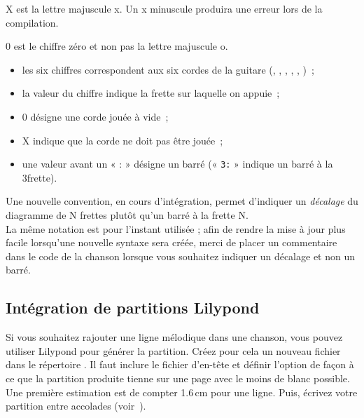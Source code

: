 \begin{songbook}
\end{songbook}

\begin{nota}
  X est la lettre majuscule x. Un x minuscule produira une erreur lors de la compilation.

  0 est le chiffre zéro et non pas la lettre majuscule o.
\end{nota}

\begin{itemize}
\item les six chiffres correspondent aux six cordes de la guitare
  (, , , ,
  , )~;
\item la valeur du chiffre indique la frette sur laquelle on
  appuie~;
\item 0 désigne une corde jouée à vide~;
\item X indique que la corde ne doit pas être jouée~;
\item une valeur avant un « : » désigne un barré (« \verb|3:| » indique
  un barré à la 3\ieme frette).
\end{itemize}

\begin{nota}
  Une nouvelle convention, en cours d'intégration, permet d'indiquer un
  \emph{décalage} du diagramme de N frettes plutôt qu'un barré à la
  frette N.\\
  La même notation est pour l'instant utilisée ; afin de rendre la mise à
  jour plus facile lorsqu'une nouvelle syntaxe sera créée, merci de
  placer un commentaire dans le code de la chanson lorsque vous souhaitez
  indiquer un décalage et non un barré.
\end{nota}

\subsection{Intégration de partitions Lilypond}

Si vous souhaitez rajouter une ligne mélodique dans une chanson, vous
pouvez utiliser Lilypond pour générer la partition. Créez pour cela
un nouveau fichier  dans le répertoire
. Il faut inclure le fichier d'en-tête
 et définir l'option  de façon à ce que la
partition produite tienne sur une page avec le moins de blanc
possible. Une première estimation est de compter 1.6\,cm pour une
ligne. Puis, écrivez votre partition entre accolades
(voir~).

